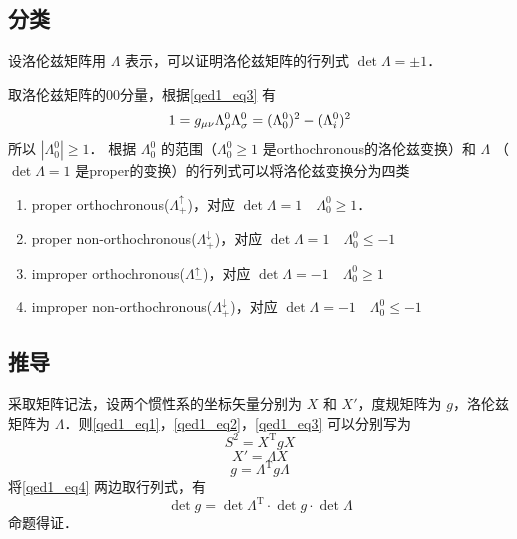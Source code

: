 \subsection{分类}
设洛伦兹矩阵用 $\Lambda$ 表示，可以证明洛伦兹矩阵的行列式 $\det \Lambda=\pm1$．

取洛伦兹矩阵的00分量，根据\autoref{qed1_eq3} 有
\begin{equation}
1=g_{\mu \nu} \Lambda_{\rho}^{0} \Lambda_{\sigma}^{0}= (\Lambda_{0}^{0})^2- (\Lambda_{i}^{0})^2\\
\end{equation}
所以 $\left|\Lambda_{0}^{0} \right|\geqslant1$． 根据 $\Lambda_{0}^{0}$ 的范围（$\Lambda_{0}^{0}\geqslant1$ 是orthochronous的洛伦兹变换）和 $\Lambda$ （$\det\Lambda=1$ 是proper的变换）的行列式可以将洛伦兹变换分为四类
\begin{enumerate}
\item proper orthochronous($\Lambda_{+}^{\uparrow}$)，对应 $\det\Lambda=1\quad \Lambda_{0}^{0}\geqslant1$．
\item proper non-orthochronous($\Lambda_{+}^{\downarrow}$)，对应 $\det\Lambda=1\quad \Lambda_{0}^{0}\leqslant-1$
\item improper orthochronous($\Lambda_{-}^{\uparrow}$)，对应 $\det\Lambda=-1 \quad\Lambda_{0}^{0}\geqslant1$
\item improper non-orthochronous($\Lambda_{+}^{\downarrow}$)，对应 $\det\Lambda=-1 \quad\Lambda_{0}^{0}\leqslant-1$
\end{enumerate}

\subsection{推导}
采取矩阵记法，设两个惯性系的坐标矢量分别为 $X$ 和 $X'$，度规矩阵为 $g$，洛伦兹矩阵为 $\Lambda$．则\autoref{qed1_eq1}，\autoref{qed1_eq2}，\autoref{qed1_eq3} 可以分别写为
\begin{equation}
S^{2}=X^{\mathrm{T}} g X
\end{equation}
\begin{equation}
X'=\Lambda X
\end{equation}
\begin{equation}\label{qed1_eq4}
g=\Lambda^{\mathrm{T}} g \Lambda
\end{equation}
将\autoref{qed1_eq4} 两边取行列式，有
\begin{equation}
\det g=\det\Lambda^{\mathrm{T}}\cdot \det g\cdot \det\Lambda
\end{equation}
命题得证．
